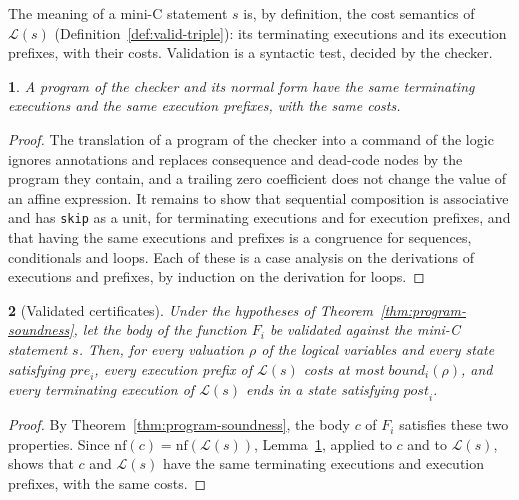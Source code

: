 \documentclass[oneside,english]{amsart}
\numberwithin{equation}{section}
\numberwithin{figure}{section}
\theoremstyle{plain}
\newtheorem{thm}{\protect\theoremname}
\theoremstyle{definition}
\theoremstyle{plain}
\theoremstyle{remark}
\theoremstyle{plain}
\newtheorem{lem}[thm]{\protect\lemmaname}
\theoremstyle{definition}
\theoremstyle{plain}
\theoremstyle{remark}
\providecommand{\lemmaname}{Lemma}
\providecommand{\theoremname}{Theorem}
\begin{document}
The meaning of a mini-C statement $s$ is, by definition, the cost semantics of $\mathcal{L}(s)$ (Definition~\ref{def:valid-triple}): its terminating executions and its execution prefixes, with their costs. Validation is a syntactic test, decided by the checker.

\begin{lem}
\label{lem:nf-equiv}
A program of the checker and its normal form have the same terminating executions and the same execution prefixes, with the same costs.
\end{lem}

\begin{proof}
The translation of a program of the checker into a command of the logic ignores annotations and replaces consequence and dead-code nodes by the program they contain, and a trailing zero coefficient does not change the value of an affine expression. It remains to show that sequential composition is associative and has \texttt{skip} as a unit, for terminating executions and for execution prefixes, and that having the same executions and prefixes is a congruence for sequences, conditionals and loops. Each of these is a case analysis on the derivations of executions and prefixes, by induction on the derivation for loops.
\end{proof}

\begin{thm}[Validated certificates]
\label{thm:validated}
Under the hypotheses of Theorem~\ref{thm:program-soundness}, let the body of the function $F_i$ be validated against the mini-C statement $s$. Then, for every valuation $\rho$ of the logical variables and every state satisfying $\mathit{pre}_i$, every execution prefix of $\mathcal{L}(s)$ costs at most $\mathit{bound}_i(\rho)$, and every terminating execution of $\mathcal{L}(s)$ ends in a state satisfying $\mathit{post}_i$.
\end{thm}

\begin{proof}
By Theorem~\ref{thm:program-soundness}, the body $c$ of $F_i$ satisfies these two properties. Since $\mathrm{nf}(c) = \mathrm{nf}(\mathcal{L}(s))$, Lemma~\ref{lem:nf-equiv}, applied to $c$ and to $\mathcal{L}(s)$, shows that $c$ and $\mathcal{L}(s)$ have the same terminating executions and execution prefixes, with the same costs.
\end{proof}
\end{document}
